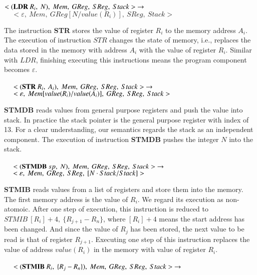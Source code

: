 \documentclass[conference]{IEEEtran}
\begin{document}
$<(\textbf{LDR}~R_i,~N),~Mem,~GReg,~SReg,~Stack>~\rightarrow\\ \\$
$~~~~~<\varepsilon,~Mem,~GReg[N/value(R_i)],~SReg,~Stack>$\\
 \par The instruction \textbf{STR} stores the value of register $R_i$ to the memory address $A_i$. The execution of instruction $STR$ changes the state of memory, i.e., replaces the data stored in the memory with address $A_i$ with the value of register $R_i$. Similar with $LDR$, finishing executing this instructions means the program component becomes $\varepsilon$.\\ \\
$~~~~~<(\textbf{STR} ~R_i,~A_i),~Mem,~GReg,~SReg,~Stack>~\rightarrow\\ \\$
$~~~~~<\varepsilon,~Mem[value(R_i)/value(A_i)],~GReg,~SReg,~Stack>\\ \\$
\par \textbf{STMDB} reads values from general purpose registers and push the value into stack. In practice the stack pointer is the general purpose register with index of 13. For a clear understanding, our semantics regards the stack as an independent component. The execution of instruction \textbf{STMDB} pushes the integer $N$ into the stack.\\ \\
$~~~~~<(\textbf{STMDB} ~sp,~N),~Mem,~GReg,~SReg,~Stack>~\rightarrow\\ \\$
$~~~~~<\varepsilon,~Mem,~GReg,~SReg,~[N\cdot Stack/Stack]>\\ \\$
\par \textbf{STMIB} reads values from a list of registers and store them into the memory. The first memory address is the value of $R_i$.  We regard its execution as non-atomoic. After one step of execution, this instruction is reduced to $STMIB~[R_i]+4,~\{R_{j+1}-R_n\}$, where $[R_i]+4$ means the start address has been changed. And since the value of $R_j$ has been stored, the next value to be read is that of register $R_{j+1}$. Executing one step of this instruction replaces the value of address $value(R_i)$ in the memory with value of register $R_i$.\\ \\
$~~~~~<(\textbf{STMIB} ~R_i,~\{R_j-R_n\}),~Mem,~GReg,~SReg,~Stack>~\rightarrow\\ \\$
\end{document}
